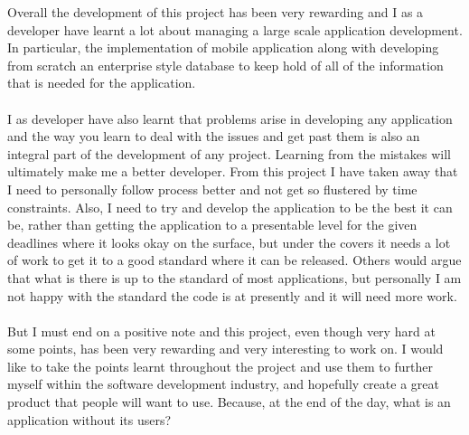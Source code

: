 Overall the development of this project has been very rewarding and I as a developer have learnt a lot about managing a large scale application development. In particular, the implementation of mobile application along with developing from scratch an enterprise style database to keep hold of all of the information that is needed for the application.\\
\\
I as developer have also learnt that problems arise in developing any application and the way you learn to deal with the issues and get past them is also an integral part of the development of any project. Learning from the mistakes will ultimately make me a better developer. From this project I have taken away that I need to personally follow process better and not get so flustered by time constraints. Also, I need to try and develop the application to be the best it can be, rather than getting the application to a presentable level for the given deadlines where it looks okay on the surface, but under the covers it needs a lot of work to get it to a good standard where it can be released. Others would argue that what is there is up to the standard of most applications, but personally I am not happy with the standard the code is at presently and it will need more work.\\
\\
But I must end on a positive note and this project, even though very hard at some points, has been very rewarding and very interesting to work on. I would like to take the points learnt throughout the project and use them to further myself within the software development industry, and hopefully create a great product that people will want to use. Because, at the end of the day, what is an application without its users?